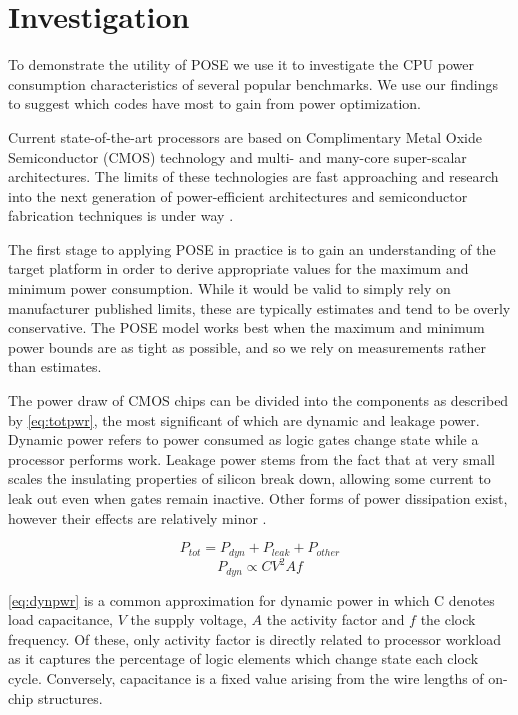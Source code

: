 \section{Investigation}
\label{sec:investigation}

To demonstrate the utility of POSE we use it to investigate the CPU power consumption characteristics of several popular benchmarks.
We use our findings to suggest which codes have most to gain from power optimization.

Current state-of-the-art processors are based on Complimentary Metal Oxide Semiconductor (CMOS) technology and multi- and many-core super-scalar architectures. The limits of these technologies are fast  approaching and research into the next generation of power-efficient architectures and semiconductor fabrication techniques is under way \cite{esmaeilzadeh:2011aa}.

The first stage to applying POSE in practice is to gain an understanding of the target platform in order to derive appropriate values for the maximum and minimum power consumption.
While it would be valid to simply rely on manufacturer published limits, these are typically estimates and tend to be overly conservative. The POSE model works best when the maximum and minimum power bounds are as tight as possible, and so we rely on measurements rather than estimates.

The power draw of CMOS chips can be divided into the components as described by \autoref{eq:totpwr}, the most significant of which are dynamic and leakage power. Dynamic power refers to power consumed as logic gates change state while a processor performs work. Leakage power stems from the fact that at very small scales the insulating properties of silicon break down, allowing some current to leak out even when gates remain inactive. Other forms of power dissipation exist, however their effects are relatively minor \cite{kaxiras:2008aa}.


\begin{equation}
\label{eq:totpwr}
P_{tot} = P_{dyn} + P_{leak} + P_{other}
\end{equation}
\begin{equation} 
\label{eq:dynpwr}
P_{dyn} \propto CV^{2}Af
\end{equation}

\autoref{eq:dynpwr} is a common approximation for dynamic power in which C denotes load capacitance, $V$ the supply voltage, $A$ the activity factor and $f$ the clock frequency. Of these, only activity factor is directly related to processor workload as it captures the percentage of logic elements which change state each clock cycle. Conversely, capacitance is a fixed value arising from the wire lengths of on-chip structures.

